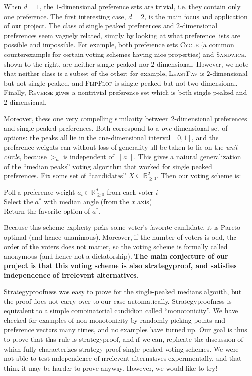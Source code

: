 \documentclass[12pt]{article}
\newcommand{\Rgz}{\mathbb{R}_{\ge 0}}
\newcommand{\1}[1]{\mathds{1}[{#1}]}
\begin{document}
  When $d=1$, the $1$-dimensional preference sets are trivial,
  i.e. they contain only one preference.
  The first interesting case, $d=2$, is the main focus and application
  of our project.
  The class of single peaked preferences and $2$-dimensional preferences
  seem vaguely related, simply by looking at what preference lists
  are possible and impossible.
  For example, both preference sets \textsc{Cycle} (a common counterexample
  for certain voting schemes having nice properties) and \textsc{Sandwich},
  shown to the right, are neither single peaked nor $2$-dimensional.
  However, we note that neither class is a subset of the other:
  for example, \textsc{LeastFav} is $2$-dimensional but not single peaked,
  and \textsc{FlipFlop} is single peaked but not two dimensional.
  Finally, \textsc{Reverse} gives a nontrivial preference set which
  is both single peaked and $2$-dimensional.

  Moreover, these one very compelling similarity between $2$-dimensional
  preferences and single-peaked preferences.
  Both correspond to a \emph{one} dimensional set of options:
  the peaks all lie in the one-dimensional interval $[0,1]$,
  and the preference weights can without loss of generality
  all be taken to lie on the \emph{unit circle},
  because $>_a$ is independent of $\|a\|$.
  This gives a natural generalization of the ``median peaks''
  voting algorithm that worked for single peaked preferences.
  Fix some set of ``candidates'' $X\subseteq \Rgz^2$.
  Then our voting scheme is:

  \begin{algorithm}
    Poll a preference weight $a_i\in\Rgz^d$ from each voter $i$ \\
    Select the $a^*$ with median angle (from the $x$ axis) \\
    Return the favorite option of $a^*$.
  \end{algorithm}

  Because this scheme explicity picks some voter's favorite candidate,
  it is Pareto-optimal (and hence unanimous).
  Moreover, if the number of voters is odd, the order of the voters
  does not matter, so the voting scheme is formally called anonymous
  (and hence not a dictatorship).
  \textbf{The main conjecture of our project is that this voting
  scheme is also strategyproof, and satisfies independence
  of irrelevent alternatives}.

  Strategyproofness was easy to prove for the single-peaked
  medians algorith, but the proof does not carry over to our case automatically.
  Strategyproofness is equivalent to a simple combinatorial condidion
  called ``monotonicity''. We have checked for examples
  of non-monotonicity by randomly picking points and preference
  vectors many times, and no examples have turned up.
  Our goal is thus to prove that this rule is strategyproof,
  and if we can, replicate the discussion of \cite{AgtBookNoMoney}
  which fully characterizes strategy-proof single-peaked voting schemes.
  We were not able to test independence of irrelevent alternatives experimentally,
  and that think it may be harder to prove anyway.
  However, we would like to try!
\end{document}
